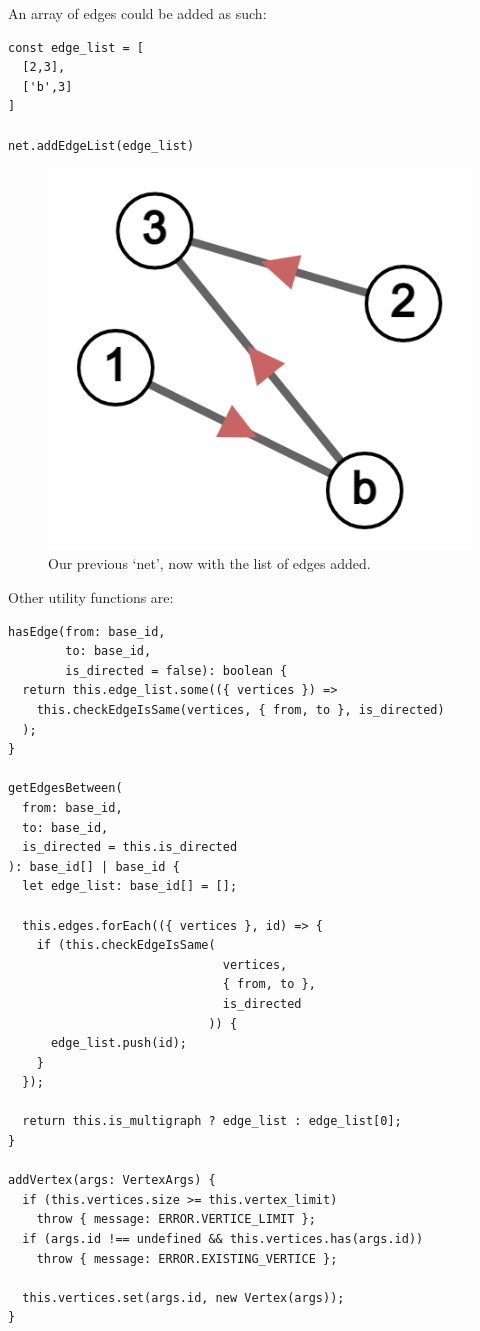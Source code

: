 An array of edges could be added as such:

\begin{verbatim}
const edge_list = [
  [2,3],
  ['b',3]
]

net.addEdgeList(edge_list)
\end{verbatim}

\begin{figure}[H]
  \includegraphics[width=\linewidth]{img/net_1b_edge_list.png}
  \caption{Our previous `net', now with the list of edges added.}
  \label{fig:net_edge_list}
\end{figure}

Other utility functions are:

\begin{verbatim}
hasEdge(from: base_id,
        to: base_id,
        is_directed = false): boolean {
  return this.edge_list.some(({ vertices }) =>
    this.checkEdgeIsSame(vertices, { from, to }, is_directed)
  );
}

getEdgesBetween(
  from: base_id,
  to: base_id,
  is_directed = this.is_directed
): base_id[] | base_id {
  let edge_list: base_id[] = [];

  this.edges.forEach(({ vertices }, id) => {
    if (this.checkEdgeIsSame(
                              vertices,
                              { from, to },
                              is_directed
                            )) {
      edge_list.push(id);
    }
  });

  return this.is_multigraph ? edge_list : edge_list[0];
}

addVertex(args: VertexArgs) {
  if (this.vertices.size >= this.vertex_limit)
    throw { message: ERROR.VERTICE_LIMIT };
  if (args.id !== undefined && this.vertices.has(args.id))
    throw { message: ERROR.EXISTING_VERTICE };

  this.vertices.set(args.id, new Vertex(args));
}
\end{verbatim}

